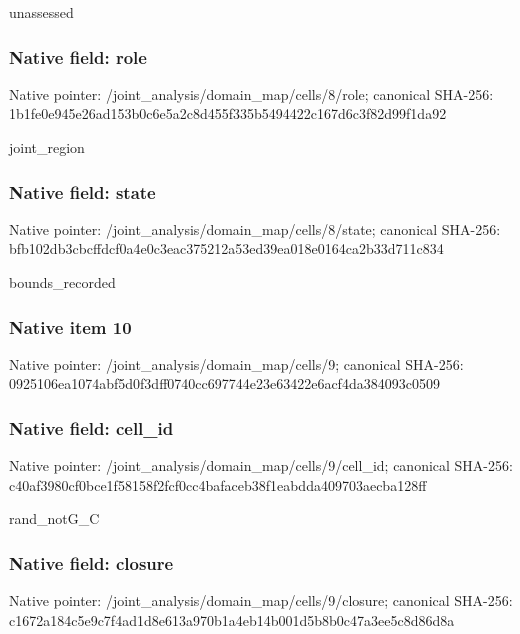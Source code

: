 \documentclass[10pt,a4paper]{article}
\begin{document}
\begingroup\raggedright\sloppy unassessed\par\endgroup

\subsubsection{Native field: role}
Native pointer: /joint\_\allowbreak{}analysis/domain\_\allowbreak{}map/cells/8/role; canonical SHA-256: 1b1fe0e945e26ad153b0c6e5a2c8d455f335b5494422c167d6c3f82d99f1da92

\begingroup\raggedright\sloppy joint\_\allowbreak{}region\par\endgroup

\subsubsection{Native field: state}
Native pointer: /joint\_\allowbreak{}analysis/domain\_\allowbreak{}map/cells/8/state; canonical SHA-256: bfb102db3cbcffdcf0a4e0c3eac375212a53ed39ea018e0164ca2b33d711c834

\begingroup\raggedright\sloppy bounds\_\allowbreak{}recorded\par\endgroup

\subsubsection{Native item 10}
Native pointer: /joint\_\allowbreak{}analysis/domain\_\allowbreak{}map/cells/9; canonical SHA-256: 0925106ea1074abf5d0f3dff0740cc697744e23e63422e6acf4da384093c0509

\subsubsection{Native field: cell\_\allowbreak{}id}
Native pointer: /joint\_\allowbreak{}analysis/domain\_\allowbreak{}map/cells/9/cell\_\allowbreak{}id; canonical SHA-256: c40af3980cf0bce1f58158f2fcf0cc4bafaceb38f1eabdda409703aecba128ff

\begingroup\raggedright\sloppy rand\_\allowbreak{}notG\_\allowbreak{}C\par\endgroup

\subsubsection{Native field: closure}
Native pointer: /joint\_\allowbreak{}analysis/domain\_\allowbreak{}map/cells/9/closure; canonical SHA-256: c1672a184c5e9c7f4ad1d8e613a970b1a4eb14b001d5b8b0c47a3ee5c8d86d8a
\end{document}
